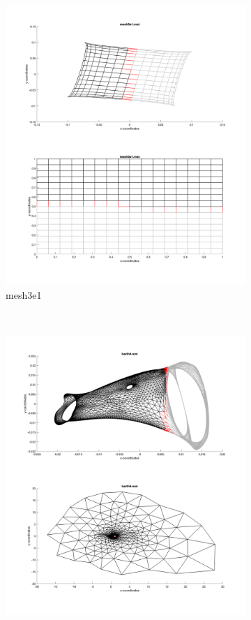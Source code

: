 \begin{figure}[H]
	\centering
	\begin{subfigure}{0.5\textwidth}
		\includegraphics[width=\textwidth]{./media/mesh3e1_eigen.png}
		\caption{mesh3e1}
		\label{fig:spec_crack}
	\end{subfigure}%
    ~
	\begin{subfigure}{0.5\textwidth}
		\includegraphics[width=\textwidth]{./media/barth4_eigen.png}

\end{subfigure}
\end{figure}
